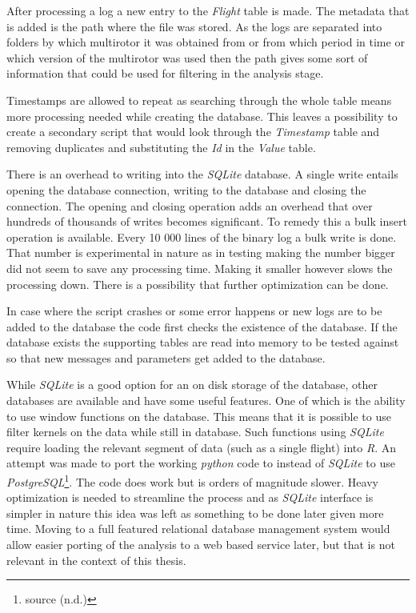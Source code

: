 \documentclass[12pt,oneside]{reedthesis}
\theoremstyle{definition}
\theoremstyle{definition}
\theoremstyle{definition}
\theoremstyle{remark}
\begin{document}
After processing a log a new entry to the \emph{Flight} table is made.
The metadata that is added is the path where the file was stored. As the
logs are separated into folders by which multirotor it was obtained from
or from which period in time or which version of the multirotor was used
then the path gives some sort of information that could be used for
filtering in the analysis stage.

Timestamps are allowed to repeat as searching through the whole table
means more processing needed while creating the database. This leaves a
possibility to create a secondary script that would look through the
\emph{Timestamp} table and removing duplicates and substituting the
\emph{Id} in the \emph{Value} table.

There is an overhead to writing into the \emph{SQLite} database. A
single write entails opening the database connection, writing to the
database and closing the connection. The opening and closing operation
adds an overhead that over hundreds of thousands of writes becomes
significant. To remedy this a bulk insert operation is available. Every
10 000 lines of the binary log a bulk write is done. That number is
experimental in nature as in testing making the number bigger did not
seem to save any processing time. Making it smaller however slows the
processing down. There is a possibility that further optimization can be
done.

In case where the script crashes or some error happens or new logs are
to be added to the database the code first checks the existence of the
database. If the database exists the supporting tables are read into
memory to be tested against so that new messages and parameters get
added to the database.

While \emph{SQLite} is a good option for an on disk storage of the
database, other databases are available and have some useful features.
One of which is the ability to use window functions on the database.
This means that it is possible to use filter kernels on the data while
still in database. Such functions using \emph{SQLite} require loading
the relevant segment of data (such as a single flight) into \emph{R}. An
attempt was made to port the working \emph{python} code to instead of
\emph{SQLite} to use \emph{PostgreSQL}\footnote{source (n.d.)}. The code
does work but is orders of magnitude slower. Heavy optimization is
needed to streamline the process and as \emph{SQLite} interface is
simpler in nature this idea was left as something to be done later given
more time. Moving to a full featured relational database management
system would allow easier porting of the analysis to a web based service
later, but that is not relevant in the context of this thesis.
\end{document}
